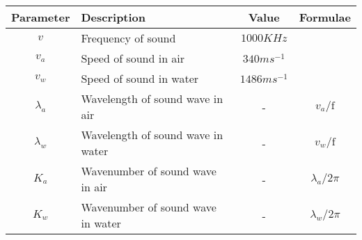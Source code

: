 \renewcommand{\arraystretch}{2}
\begin{tabular}{|c|p{2cm}|c|c|}
\hline 
\setlength{\tabcolsep}{1pt}
\textbf{Parameter}  &\textbf{Description} &\textbf{Value} &\textbf{Formulae} \\
\hline
$v$ & Frequency of sound &$1000KHz$  &\\
\hline
$v_a$ & Speed of sound in air &$340 ms^{-1}$ &\\
\hline
$v_w $ & Speed of sound in water &$ 1486 ms^{-1}$ & \\ 
\hline
$\lambda_a$& Wavelength of sound wave in air & - & $v_a/\text{f}$\\
\hline
$\lambda_w$ & Wavelength of sound wave in water& - & $v_w/\text{f}$ \\
\hline
$K_a $ & Wavenumber of sound wave in air & - & $\lambda_a/2\pi$\\
\hline
$K_w $ & Wavenumber of sound wave in water & - & $\lambda_w/2\pi$\\
\hline
\end{tabular}
